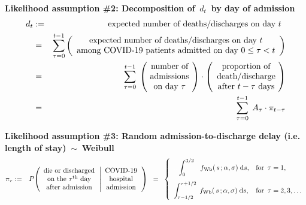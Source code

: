 
\vskip 0.5cm
\noindent
\textbf{Likelihood assumption \#2: Decomposition of \,$d_{t}$\, by day of admission}
\begin{eqnarray*}
d_{t}
& := &
	\begin{array}{c}
	\textnormal{expected number of deaths/discharges on day $t$}
	\end{array}
\\
& = &
	\overset{t-1}{\underset{\tau=0}{\sum}}
	\left(\begin{array}{c}
	\textnormal{expected number of deaths/discharges on day $t$}
	\\
	\textnormal{among COVID-19 patients admitted on day $0 \leq \tau < t$}
	\end{array}\right)
\\
& = &
	\overset{t-1}{\underset{\tau=0}{\sum}} \;
	\left(\!\begin{array}{c}
		\textnormal{number of}
		\\
		\textnormal{admissions}
		\\
		\textnormal{on day $\tau$}
		\end{array}\!\right)
	\cdot
	\left(\begin{array}{c}
		\textnormal{proportion of}
		\\
		\textnormal{death/discharge}
		\\
		\textnormal{after $t - \tau$ days}
		\end{array}\!\right)
\\
& = &
	\overset{t-1}{\underset{\tau=0}{\sum}} \;\, A_{\tau}\cdot\pi_{t-\tau}
\end{eqnarray*}


\vskip 0.5cm
\noindent
\textbf{Likelihood assumption \#3: Random admission-to-discharge delay (i.e. length of stay) \,$\sim$\, Weibull}
\begin{eqnarray*}
\pi_{\tau}
& := &
	P\!\left(
		\begin{array}{c}
			\textnormal{die or discharged}
			\\
			\textnormal{on the $\tau^{\textnormal{th}}$ day}
			\\
			\textnormal{after admission}
			\end{array}
		\left\vert
		\begin{array}{c}
			\textnormal{COVID-19}
			\\
			\textnormal{hospital}
			\\
			\textnormal{admission}
			\end{array}
			\right.
		\right)
\;\; = \;\;
	\left\{\begin{array}{ll}
		{\color{white}..}\displaystyle\int_{0}^{3/2}\,{\color{white}..}f_{\textnormal{Wb}}(\,s\,;\alpha,\sigma) \;\d s,
		& \textnormal{for \,$\tau = 1$},
		\\
		\overset{{\color{white}1}}{\displaystyle\int_{\tau-1/2}^{\tau+1/2}\; f_{\textnormal{Wb}}(\,s\,;\alpha,\sigma) \;\d s},
		& \textnormal{for \,$\tau = 2,3,\ldots$}
		\end{array}\right.
\end{eqnarray*}

